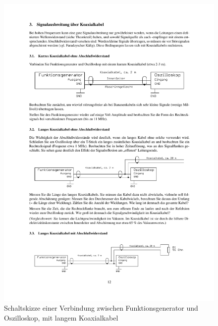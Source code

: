 \documentclass[12pt,a4paper]{article}
\begin{document}
\begin{figure}[H] 
  \centering
    \includegraphics[trim = 10mm 110mm 10mm 150mm, clip, scale = 1]{3-3_3.pdf}
  	\caption[Schaltskizze einer Verbindung zwischen Funktionsgenerator und Oszilloskop, mit langem Koaxialkabel]{Schaltskizze einer Verbindung zwischen Funktionsgenerator und Oszilloskop, mit langem Koaxialkabel\footnotemark}
  \label{fig:3.2}
\end{figure}
\end{document}
